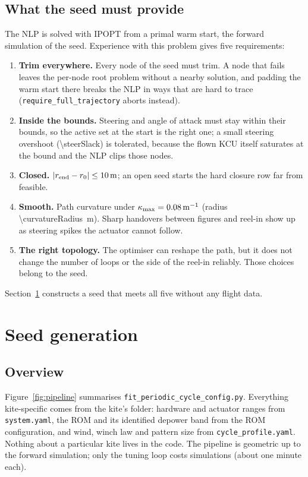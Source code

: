\documentclass[11pt,a4paper]{article}
\newcommand{\code}[1]{\texttt{\small #1}}
\begin{document}
\subsection{What the seed must provide}
\label{sec:seedreq}

The NLP is solved with IPOPT from a primal warm start, the forward simulation
of the seed. Experience with this problem gives five requirements:
\begin{enumerate}
  \item \textbf{Trim everywhere.} Every node of the seed must trim. A node
        that fails leaves the per-node root problem without a nearby
        solution, and padding the warm start there breaks the NLP in ways
        that are hard to trace (\code{require\_full\_trajectory} aborts
        instead).
  \item \textbf{Inside the bounds.} Steering and angle of attack must stay within
        their bounds, so the active set at the start is the right one; a small
        steering overshoot (\num{\steerSlack}) is tolerated, because the flown
        KCU itself saturates at the bound and the NLP clips those nodes.
  \item \textbf{Closed.} $|r_\mathrm{end}-r_0|\le\SI{10}{m}$; an
        open seed starts the hard closure row far from feasible.
  \item \textbf{Smooth.} Path curvature under
        $\kappa_{\max}=\SI{0.08}{m^{-1}}$ (radius
        \SI{\curvatureRadius}{m}). Sharp handovers between figures and reel-in
        show up as steering spikes the actuator cannot follow.
  \item \textbf{The right topology.} The optimiser can reshape the path, but
        it does not change the number of loops or the side of the reel-in
        reliably. Those choices belong to the seed.
\end{enumerate}
Section~\ref{sec:seed} constructs a seed that meets all five without any
flight data.

\section{Seed generation}
\label{sec:seed}

\subsection{Overview}

Figure~\ref{fig:pipeline} summarises \code{fit\_periodic\_cycle\_config.py}.
Everything kite-specific comes from the kite's folder: hardware and actuator
ranges from \code{system.yaml}, the ROM and its identified depower band from
the ROM configuration, and wind, winch law and pattern size from
\code{cycle\_profile.yaml}. Nothing about a particular kite lives in the code.
The pipeline is geometric up to the forward simulation; only the tuning loop
costs simulations (about one minute each).
\end{document}
